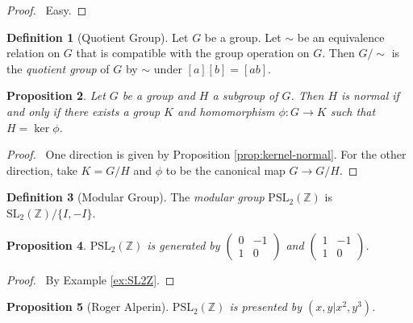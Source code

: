 \documentclass{book}
\let\qed\relax
\newtheorem{prop}{Proposition}[chapter]
\theoremstyle{definition}
\newtheorem{df}[prop]{Definition}
\begin{document}
\begin{proof}
\pf\ Easy. \qed
\end{proof}

\begin{df}[Quotient Group]
Let $G$ be a group. Let $\sim$ be an equivalence relation on $G$ that is compatible with the group operation on $G$. Then $G/\sim$ is the \emph{quotient group} of $G$ by $\sim$ under $[a][b] = [ab]$.
\end{df}

\begin{prop}
Let $G$ be a group and $H$ a subgroup of $G$. Then $H$ is normal if and only if there exists a group $K$ and homomorphism $\phi : G \rightarrow K$ such that $H = \ker \phi$.
\end{prop}

\begin{proof}
\pf\ One direction is given by Proposition \ref{prop:kernel-normal}. For the other direction, take $K = G / H$ and $\phi$ to be the canonical map $G \rightarrow G / H$. \qed
\end{proof}

\begin{df}[Modular Group]
The \emph{modular group} $\mathrm{PSL}_2(\mathbb{Z})$ is $\mathrm{SL}_2(\mathbb{Z}) / \{ I, -I \}$.
\end{df}

\begin{prop}
$\mathrm{PSL}_2(\mathbb{Z})$ is generated by $\left( \begin{array}{cc} 0 & -1 \\ 1 & 0 \end{array} \right)$ and $\left( \begin{array}{cc} 1 & -1 \\ 1 & 0 \end{array} \right)$.
\end{prop}

\begin{proof}
\pf\ By Example \ref{ex:SL2Z}. 
\end{proof}

\begin{prop}[Roger Alperin]
$\mathrm{PSL}_2(\mathbb{Z})$ is presented by $(x,y|x^2,y^3)$.
\end{prop}
\end{document}
